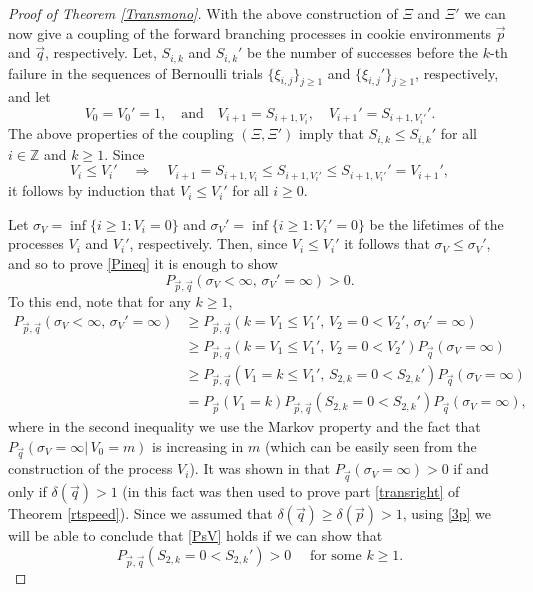 \documentclass[reqno,letterpaper,11pt]{amsart}
\theoremstyle{remark}
\theoremstyle{definition}
\begin{document}
\begin{proof}[Proof of Theorem \ref{Transmono}]
With the above construction of $\Xi$ and $\Xi'$ we can now give a coupling of the forward branching processes in cookie environments ${\vec{p}}$ and ${\vec{q}}$, respectively. Let, $S_{i,k}$ and $S_{i,k}'$ be the number of successes before the $k$-th failure in the sequences of Bernoulli trials $\{\xi_{i,j}\}_{j\geq 1}$ and $\{\xi_{i,j}'\}_{j\geq 1}$, respectively, and let
\[
 V_0 = V_0' = 1, \quad\text{and}\quad V_{i+1} = S_{i+1,V_i}, \quad  V_{i+1}' = S_{i+1,V_i'}'.
\]
The above properties of the coupling $(\Xi,\Xi')$ imply that
$S_{i,k} \leq S_{i,k}'$ for all $i\in {\mathbb Z}$ and $k\geq 1$. Since 
\[
V_i \leq V_i' \quad \Longrightarrow \quad 
 V_{i+1} = S_{i+1,V_i} \leq S_{i+1,V_i'} \leq S_{i+1,V_i'}' = V_{i+1}', 
\]
it follows by induction that $V_i \leq V_i'$ for all $i\geq 0$. 

Let ${\sigma}_V = \inf \{ i\geq 1: V_i = 0 \}$ and ${\sigma}_V' = \inf \{ i\geq 1: V_i' = 0 \}$ be the lifetimes of the processes $V_i$ and $V_i'$, respectively. Then, since $V_i \leq V_i'$ it follows that $ {\sigma}_V \leq {\sigma}_V'$, and so to prove \eqref{Pineq} it is enough to show
\begin{equation}\label{PsV}
 P_{{\vec{p}},{\vec{q}}}({\sigma}_V < \infty, \, {\sigma}_V' = \infty) > 0. 
\end{equation}
To this end, note that for any $k\geq 1$, 
\begin{align}
 P_{{\vec{p}},{\vec{q}}}({\sigma}_V < \infty, \, {\sigma}_V' = \infty) 
&\geq P_{{\vec{p}},{\vec{q}}}( k = V_1 \leq V_1', \, V_2 = 0 < V_2', \, {\sigma}_V' = \infty ) \nonumber \\
&\geq P_{{\vec{p}},{\vec{q}}}( k = V_1 \leq V_1', \, V_2 = 0 < V_2') P_{\vec{q}}({\sigma}_V = \infty)  \nonumber \\
&\geq P_{{\vec{p}},{\vec{q}}}( V_1 = k \leq V_1', \, S_{2,k} = 0 < S_{2,k}') P_{\vec{q}}({\sigma}_V = \infty)  \nonumber \\
&= P_{\vec{p}}( V_1 = k )P_{{\vec{p}},{\vec{q}}}(S_{2,k} = 0 < S_{2,k}') P_{\vec{q}}({\sigma}_V = \infty), \label{3p}
\end{align}
where in the second inequality we use the Markov property and the fact that $P_{\vec{q}}({\sigma}_V = \infty |\, V_0 = m )$ is increasing in $m$ (which can be easily seen from the construction of the process $V_i$).
It was shown in \cite{kzPNERW} that $P_{\vec{q}}({\sigma}_V = \infty) > 0$ if and only if ${\delta}({\vec{q}}) > 1$ (in \cite{kzPNERW} this fact was then used to prove part \ref{transright} of Theorem \ref{rtspeed}). Since we assumed that ${\delta}({\vec{q}}) \geq {\delta}({\vec{p}}) > 1$, using \eqref{3p} we will be able to conclude that \eqref{PsV} holds if we can show that 
\begin{equation}\label{Sineq}
 P_{{\vec{p}},{\vec{q}}}(S_{2,k} = 0 < S_{2,k}') > 0 \quad \text{ for some } k\geq 1. 
\end{equation}


\end{proof}
\end{document}
